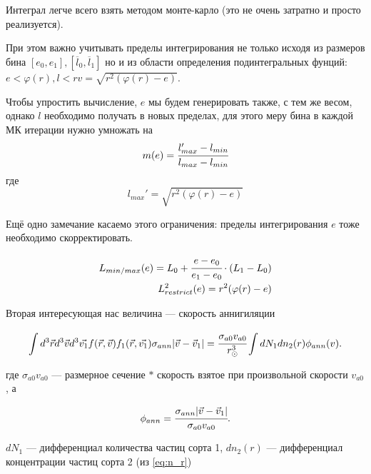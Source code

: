\documentclass[a4paper, 14pt]{article}
\begin{document}
\begin{enumerate}
	 		
	 	Интеграл легче всего взять методом монте-карло (это не очень затратно и просто реализуется).
	 	
	 	При этом важно учитывать пределы интегрирования не только исходя из размеров бина $[e_0,e_1],[\overline{l}_0,\overline{l}_1]$ но и из области определения подинтегральных фунций: $e<\varphi(r), l<rv = \sqrt{r^2(\varphi(r)-e)}$.
	 	
	 	Чтобы упростить вычисление, $e$ мы будем генерировать также, с тем же весом, однако $l$ необходимо получать в новых пределах, для этого меру бина в каждой МК итерации нужно умножать на 
	 	\begin{equation*}
	 		m(e) = \cfrac{l_{max}'-l_{min}}
	 		{l_{max}-l_{min}}
	 	\end{equation*}
	 	где 
	 	\begin{equation*}
	 		l_{max}' = \sqrt{r^2(\varphi(r)-e)}
	 	\end{equation*}
	 	
	 	Ещё одно замечание касаемо этого ограничения: пределы интегрирования $e$ тоже необходимо скорректировать.
	 	
	 	\begin{eqnarray}
	 		L_{min/max}(e) = L_0 + \cfrac{e-e_0}{e_1-e_0} \cdot (L_1-L_0)
	 		\\
	 		L^2_{restrict}(e) = r^2(\varphi(r)-e)	 		
	 	\end{eqnarray}
	 	
	 \end{enumerate}
	 
	 Вторая интересующая нас величина --- скорость аннигиляции
	 
	 \begin{equation}
	 	\label{eq:ann_st}
	 	\int{d^3\vec{r} d^3\vec{v}  d^3\vec{v_1} 
	 		f(\vec{r},\vec{v})f_1(\vec{r},\vec{v_1}) \sigma_{ann} 
	 		|\vec{v}-\vec{v}_1|} = \cfrac{\sigma_{a0}v_{a0}}{r_{\odot}^3} \int{dN_1 dn_2(r) \phi_{ann}(v) }.
	 \end{equation}
	 
	 где $\sigma_{a0}v_{a0}$ --- размерное сечение $*$ скорость взятое при произвольной скорости $v_{a0}$, а 
	 
	\begin{equation}
		\phi_{ann} = \cfrac{\sigma_{ann} |\vec{v}-\vec{v}_1| }{\sigma_{a0}  v_{a0}}.
	\end{equation}
	
	$dN_1$ --- дифференциал количества частиц сорта 1, $dn_2(r)$ --- дифференциал концентрации частиц сорта 2  (из \ref{eq:n_r})
	
\end{document}
